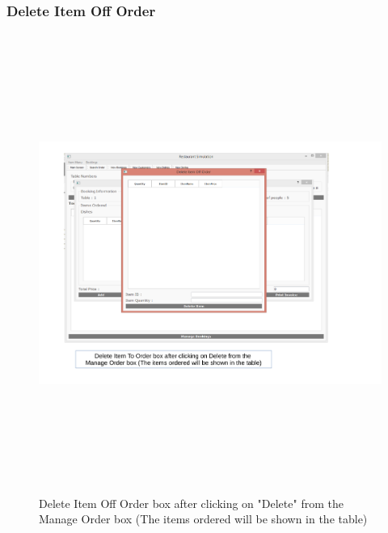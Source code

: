 \begin{landscape}
\subsubsection{Delete Item Off Order}
\begin{figure}[H]
    \includegraphics[height = 15cm]{./Maintenance/images/screen12}
    \caption{Delete Item Off Order box after clicking on "Delete" from the Manage Order box (The items ordered will be shown in the table)} \label{fig:screen12}
\end{figure}


\end{landscape}
